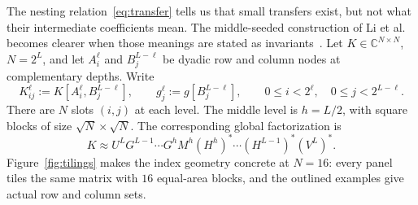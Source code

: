 \documentclass[11pt,a4paper]{article}
\begin{document}
The nesting relation~\eqref{eq:transfer} tells us that small transfers exist, but not what their intermediate coefficients mean. The middle-seeded construction of Li et al. becomes clearer when those meanings are stated as invariants~\cite{li2015butterfly}. Let $K\in\mathbb C^{N\times N}$, $N=2^L$, and let $A_i^\ell$ and $B_j^{L-\ell}$ be dyadic row and column nodes at complementary depths. Write
\begin{equation}
 K_{ij}^{\ell}:=K[A_i^\ell,B_j^{L-\ell}],
 \qquad g_j^\ell:=g[B_j^{L-\ell}],
 \qquad 0\le i<2^\ell,\quad 0\le j<2^{L-\ell}.
 \label{eq:invariant-block}
\end{equation}
There are $N$ slots $(i,j)$ at each level. The middle level is $h=L/2$, with square blocks of size $\sqrt N\times\sqrt N$. The corresponding global factorization is
\[
 K\approx U^LG^{L-1}\cdots G^hM^h(H^h)^*\cdots(H^{L-1})^*(V^L)^*.
\]
Figure~\ref{fig:tilings} makes the index geometry concrete at $N=16$: every panel tiles the same matrix with $16$ equal-area blocks, and the outlined examples give actual row and column sets.
\end{document}

